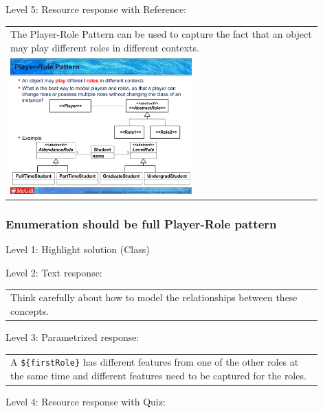 \noindent Level 5: Resource response with Reference: \medskip

\begin{tabular}{|p{0.9\linewidth}}
The Player-Role Pattern can be used to capture the fact that an object may play different roles
in different contexts.

\\
\includegraphics[width=0.6\textwidth]{images/player_role.png}
\end{tabular} \medskip


\subsubsection{Enumeration should be full Player-Role pattern}

\noindent Level 1: Highlight solution (Class) \medskip

\noindent Level 2: Text response: \medskip

\begin{tabular}{|p{0.9\linewidth}}
Think carefully about how to model the relationships between these concepts.
\end{tabular} \medskip

\noindent Level 3: Parametrized response: \medskip

\begin{tabular}{|p{0.9\linewidth}}
A \verb|${firstRole}| has different features from one of the other roles at the same time and different features need to be captured for the roles.
\end{tabular} \medskip

\noindent Level 4: Resource response with Quiz: \medskip


